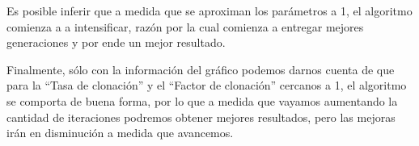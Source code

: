 Es posible inferir que a medida que se aproximan los parámetros a 1, el algoritmo
comienza a a intensificar, razón por la cual comienza a entregar mejores generaciones y por ende
un mejor resultado.

Finalmente, sólo con la información del gráfico podemos darnos cuenta de que
para la ``Tasa de clonación'' y el ``Factor de clonación'' cercanos a 1,
el algoritmo se comporta de buena forma, por lo que a medida que vayamos aumentando
la cantidad de iteraciones podremos obtener mejores resultados, pero las mejoras
irán en disminución a medida que avancemos.

%
%
\newpage

